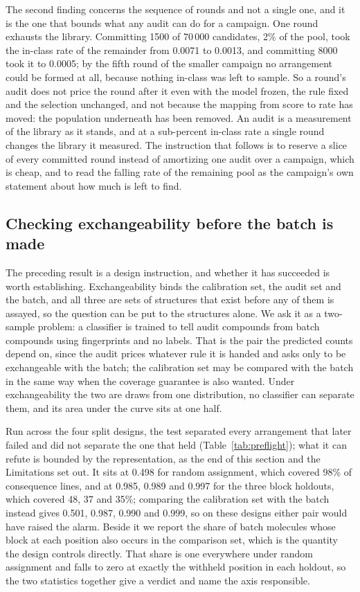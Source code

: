 \documentclass[twocolumn,10pt]{article}
\begin{document}
The second finding concerns the sequence of rounds and not a single one, and it is the one that bounds
what any audit can do for a campaign. One round exhausts the library. Committing 1500 of
70\,000 candidates, 2\% of the pool, took the in-class rate of the remainder from 0.0071 to
0.0013, and committing 8000 took it to 0.0005; by the fifth round of the smaller campaign no
arrangement could be formed at all, because nothing in-class was left to sample. So a round's
audit does not price the round after it even with the model frozen, the rule fixed and the
selection unchanged, and not because the mapping from score to rate has moved: the population
underneath has been removed. An audit is a measurement of the library as it stands, and at a
sub-percent in-class rate a single round changes the library it measured. The instruction that
follows is to reserve a slice of every committed round instead of amortizing one audit over a campaign, which is cheap, and to read the falling rate of the remaining pool as the campaign's
own statement about how much is left to find.

\subsection{Checking exchangeability before the batch is made}
\label{sec:results:preflight}

The preceding result is a design instruction, and whether it has succeeded is worth establishing. Exchangeability binds the calibration set, the audit set and the batch, and all three are sets of structures that exist before any of them is assayed, so the question can be put to the structures alone. We ask it as a two-sample problem: a classifier is trained to tell audit compounds from batch compounds using fingerprints and no labels. That is the pair the predicted counts depend on, since the audit prices whatever rule it is handed and asks only to be exchangeable with the batch; the calibration set may be compared with the batch in the same way when the coverage guarantee is also wanted. Under exchangeability the two are draws from one distribution, no classifier can separate them, and its area under the curve sits at one half.

Run across the four split designs, the test separated every arrangement that later failed and did not separate the one that held (Table~\ref{tab:preflight}); what it can refute is bounded by the representation, as the end of this section and the Limitations set out. It sits at 0.498 for random assignment, which covered 98\% of consequence lines, and at 0.985, 0.989 and 0.997 for the three block holdouts, which covered 48, 37 and 35\%; comparing the calibration set with the batch instead gives 0.501, 0.987, 0.990 and 0.999, so on these designs either pair would have raised the alarm. Beside it we report the share of batch molecules whose block at each position also occurs in the comparison set, which is the quantity the design controls directly. That share is one everywhere under random assignment and falls to zero at exactly the withheld position in each holdout, so the two statistics together give a verdict and name the axis responsible.
\end{document}
